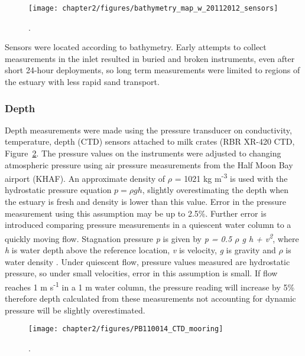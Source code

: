\begin{figure}
	\begin{center}
		\texttt{[image: chapter2/figures/bathymetry\_map\_w\_20112012\_sensors]} \caption{.}\label{fig:BathyCh2}
	\end{center}
\end{figure}


Sensors were located according to bathymetry. Early attempts to collect measurements in the inlet resulted in buried and broken instruments, even after short 24-hour deployments, so long term measurements were limited to regions of the estuary with less rapid sand transport. 

\subsubsection{Depth} \label{sssec:depth}
Depth measurements were made using the pressure transducer on conductivity, temperature, depth (CTD) sensors
attached to milk crates (RBR XR-420 CTD, Figure~\ref{fig:CTDphoto}. The pressure values on the instruments were adjusted to
changing atmospheric pressure using air pressure measurements from the Half Moon Bay airport (KHAF). An approximate density of $\rho$ = 1021 kg m\textsuperscript{-3} is used with the hydrostatic pressure equation ${p = \rho g h}$, slightly overestimating the depth when the estuary is fresh and density is lower than this value. Error in the pressure measurement using this assumption may be up to 2.5\%. Further error is introduced comparing pressure measurements in a quiescent water column to a quickly moving flow. Stagnation pressure \emph{p} is given by \emph{p = 0.5 $\rho$ g h +  v\textsuperscript{2}}, where \emph{h} is water depth above the reference location, \emph{v} is velocity, \emph{g} is gravity and \emph{$\rho$} is water density \parencite{young_brief_2004}. Under quiescent flow, pressure values measured are hydrostatic pressure, so under small velocities, error in this assumption is small. If flow reaches 1 m s\textsuperscript{-1} in a 1 m water column, the pressure reading will increase by 5\% therefore depth calculated from these measurements not accounting for dynamic pressure will be slightly overestimated.

\begin{figure}
	\begin{center}
		\texttt{[image: chapter2/figures/PB110014\_CTD\_mooring]} \caption{.}\label{fig:CTDphoto}
	\end{center}
\end{figure}


